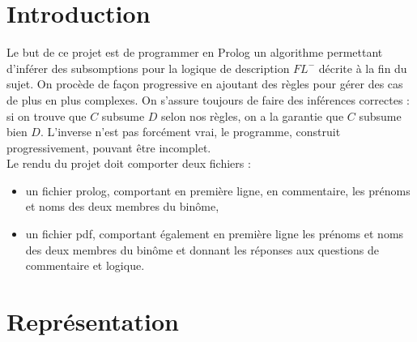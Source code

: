 \documentclass[a4paper,12pt]{report}
\begin{document}

\tableofcontents






\newpage

\chapter*{Introduction}

Le but de ce projet est de programmer en Prolog un algorithme permettant d'inférer des subsomptions pour la logique de description \(FL^-\) décrite à la fin du sujet.
    On procède de façon progressive en ajoutant des règles pour gérer des cas de plus en plus complexes. On s'assure toujours de faire des inférences correctes : si on trouve
    que \(C\) subsume \(D\) selon nos règles, on a la garantie que \(C\) subsume bien \(D\). L'inverse n'est pas forcément vrai, le programme, construit progressivement, pouvant
    être incomplet.\\

Le rendu du projet doit comporter deux fichiers :
\begin{itemize}
    \item un fichier prolog, comportant en première ligne, en commentaire, les prénoms et noms des deux membres du binôme,
    \item un fichier pdf, comportant également en première ligne les prénoms et noms des deux membres du binôme et donnant les réponses aux questions de commentaire et logique.
\end{itemize}

\newpage






\newpage

\chapter*{Représentation}
\end{document}
